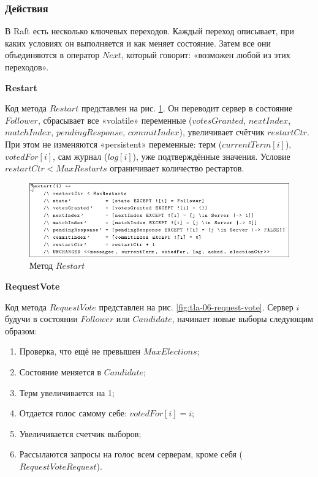 \subsubsection*{Действия}

В Raft есть несколько ключевых переходов. Каждый переход описывает, при каких
условиях он выполняется и как меняет состояние. Затем все они объединяются в
оператор $Next$, который говорит: «возможен любой из этих переходов».

\textbf{Restart}

Код метода $Restart$ представлен на рис. \ref{fig:tla-06-restart}. Он переводит
сервер в состояние $Follower$, сбрасывает все «volatile» переменные ($votesGranted$,
$nextIndex$, $matchIndex$, $pendingResponse$, $commitIndex$), увеличивает счётчик
$restartCtr$. При этом не изменяются «persistent» переменные: терм ($currentTerm[i]$),
$votedFor[i]$, сам журнал ($log[i]$), уже подтверждённые значения. Условие
$restartCtr < MaxRestarts$ ограничивает количество рестартов.

\begin{figure}
  \centering
  \includegraphics[scale=0.4]{inc/tla-06-restart.png}
  \caption{Метод $Restart$}
  \label{fig:tla-06-restart}
\end{figure}

\textbf{RequestVote}

Код метода $RequestVote$ представлен на рис. \ref{fig:tla-06-request-vote}. Сервер
$i$ будучи в состоянии $Follower$ или $Candidate$, начинает новые выборы следующим
образом:

\begin{enumerate}
    \item Проверка, что ещё не превышен $MaxElections$;
    \item Состояние меняется в $Candidate$;
    \item Терм увеличивается на 1;
    \item Отдается голос самому себе: $votedFor[i] = i$;
    \item Увеличивается счетчик выборов;
    \item Рассылаются запросы на голос всем серверам, кроме себя ($RequestVoteRequest$).
\end{enumerate}

